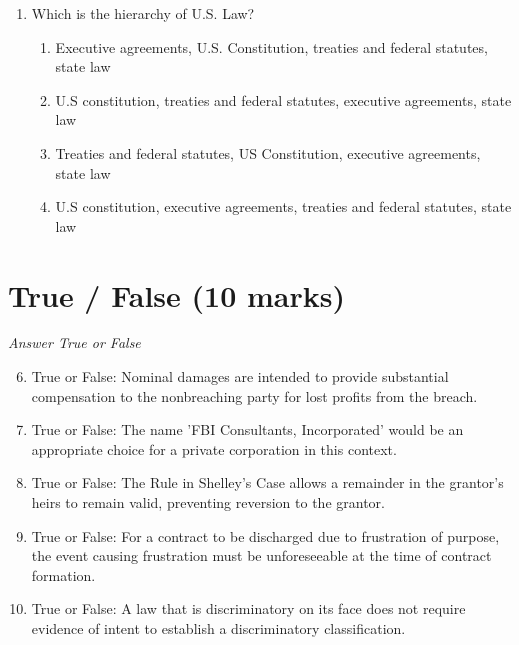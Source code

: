 \documentclass[12pt]{article}
\begin{document}
\begin{enumerate}[label=\arabic*.]
\begin{enumerate}[label=(\alph*)]
    \item Pay just compensation for the property
    \item Terminate the regulation and pay damages that occurred while regulation was in effect
    \item Pay double damages if not addressed in 30 days.
    \item a or b
\end{enumerate}
\item Which is the hierarchy of U.S. Law?
\begin{enumerate}[label=(\alph*)]
    \item Executive agreements, U.S. Constitution, treaties and federal statutes, state law
    \item U.S constitution, treaties and federal statutes, executive agreements, state law
    \item Treaties and federal statutes, US Constitution, executive agreements, state law
    \item U.S constitution, executive agreements, treaties and federal statutes, state law
\end{enumerate}
\end{enumerate}

\section*{True / False (10 marks)}
\textit{Answer True or False}
\begin{enumerate}[label=\arabic*.]
\setcounter{enumi}{5}
\item True or False: Nominal damages are intended to provide substantial compensation to the nonbreaching party for lost profits from the breach.
\item True or False: The name 'FBI Consultants, Incorporated' would be an appropriate choice for a private corporation in this context.
\item True or False: The Rule in Shelley's Case allows a remainder in the grantor's heirs to remain valid, preventing reversion to the grantor.
\item True or False: For a contract to be discharged due to frustration of purpose, the event causing frustration must be unforeseeable at the time of contract formation.
\item True or False: A law that is discriminatory on its face does not require evidence of intent to establish a discriminatory classification.
\end{enumerate}
\end{document}
